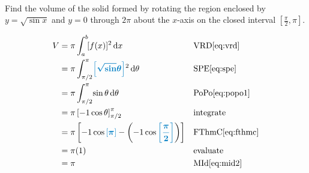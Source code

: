 \begin{example}[id:20141106-122528] \label{20141106-122528}  \hfill \\
	
Find the volume of the solid formed by rotating the region enclosed by $y=\sqrt{\sin x}$ and $y=0$ through $2\pi$ about the $x$-axis on the closed interval $\left[\frac{\pi}{2}, \pi \right]$.

\soln

\solnsteps
\begin{align*}
V & = \pi \displaystyle \int_{a}^{b} \! [f(x)]^2 \, \mathrm{d} x &&\text{VRD}\eqref{eq:vrd} \\
  & = \pi \displaystyle \int_{\pi/2}^{\pi} \! \farg{\sqrt{\sin} \theta}^2 \, \mathrm{d} \theta && \text{SPE} \eqref{eq:spe} \\
  & = \pi \displaystyle \int_{\pi/2}^{\pi} \! \sin \theta  \, \mathrm{d} \theta && \text{PoPo} \eqref{eq:popo1} \\
  & = \pi \left[ -1 \cos \theta \right]_{\pi/2}^{\pi}  &&\text{integrate} \\
  & = \pi \left[-1\cos \farg{\pi}- \left(-1\cos \farg{\dfrac{\pi}{2}} \right) \right] && \text{FThmC} \eqref{eq:fthmc} \\
  & = \pi (1)  &&\text{evaluate} \\
  & = \pi && \text{MId} \eqref{eq:mid2}  
\end{align*}


\end{example}


